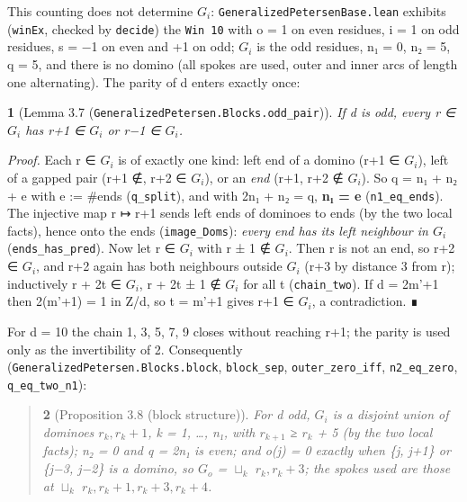 \documentclass[11pt,a4paper]{article}
\theoremstyle{named}
\newtheorem*{namedthm}{}
\begin{document}
This counting does not determine $G_i$: \texttt{GeneralizedPetersenBase.\allowbreak{}lean} exhibits (\texttt{winEx}, checked by \texttt{decide}) the \texttt{Win\ \allowbreak{}10} with o = 1 on even residues, i = 1 on odd residues, s = −1 on even and +1 on odd; $G_i$ is the odd residues, n₁ = 0, n₂ = 5, q = 5, and there is no domino (all spokes are used, outer and inner arcs of length one alternating). The parity of d enters exactly once:

\begin{namedthm}[Lemma 3.7 (\texttt{GeneralizedPetersen.\allowbreak{}Blocks.\allowbreak{}odd\_\allowbreak{}pair})]
If d is odd, every r ∈ $G_i$ has r+1 ∈ $G_i$ or r−1 ∈ $G_i$.
\end{namedthm}

\textit{Proof.} Each r ∈ $G_i$ is of exactly one kind: left end of a domino (r+1 ∈ $G_i$), left of a gapped pair (r+1 ∉, r+2 ∈ $G_i$), or an \textit{end} (r+1, r+2 ∉ $G_i$). So q = n₁ + n₂ + e with e := \#ends (\texttt{q\_\allowbreak{}split}), and with 2n₁ + n₂ = q, \textbf{n₁ = e} (\texttt{n1\_\allowbreak{}eq\_\allowbreak{}ends}). The injective map r ↦ r+1 sends left ends of dominoes to ends (by the two local facts), hence onto the ends (\texttt{image\_\allowbreak{}Doms}): \textit{every end has its left neighbour in $G_i$} (\texttt{ends\_\allowbreak{}has\_\allowbreak{}pred}). Now let r ∈ $G_i$ with r ± 1 ∉ $G_i$. Then r is not an end, so r+2 ∈ $G_i$, and r+2 again has both neighbours outside $G_i$ (r+3 by distance 3 from r); inductively r + 2t ∈ $G_i$, r + 2t ± 1 ∉ $G_i$ for all t (\texttt{chain\_\allowbreak{}two}). If d = 2m'+1 then 2(m'+1) = 1 in Z/d, so t = m'+1 gives r+1 ∈ $G_i$, a contradiction. ∎

For d = 10 the chain 1, 3, 5, 7, 9 closes without reaching r+1; the parity is used only as the invertibility of 2. Consequently (\texttt{GeneralizedPetersen.\allowbreak{}Blocks.\allowbreak{}block}, \texttt{block\_\allowbreak{}sep}, \texttt{outer\_\allowbreak{}zero\_\allowbreak{}iff}, \texttt{n2\_\allowbreak{}eq\_\allowbreak{}zero}, \texttt{q\_\allowbreak{}eq\_\allowbreak{}two\_\allowbreak{}n1}):

\begin{quote}
\begin{namedthm}[Proposition 3.8 (block structure)]
For d odd, $G_i$ is a disjoint union of dominoes ${r_k, r_k+1}$, k = 1, …, n₁, with $r_{k+1}$ ≥ $r_k$ + 5 (by the two local facts); n₂ = 0 and q = 2n₁ is even; and o(j) = 0 exactly when \{j, j+1\} or \{j−3, j−2\} is a domino, so $G_o$ = $⊔_k$ ${r_k, r_k+3}$; the spokes used are those at $⊔_k$ ${r_k, r_k+1, r_k+3, r_k+4}$.
\end{namedthm}
\end{quote}
\end{document}
